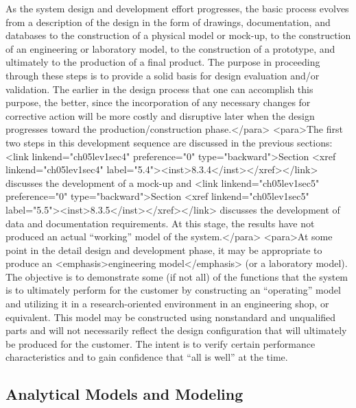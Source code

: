 As the system design and development effort progresses, the basic process evolves from a description of the design in the form of drawings, documentation, and databases to the construction of a physical model or mock-up, to the construction of an engineering or laboratory model, to the construction of a prototype, and ultimately to the production of a final product. The purpose in proceeding through these steps is to provide a solid basis for design evaluation and/or validation. The earlier in the design process that one can accomplish this purpose, the better, since the incorporation of any necessary changes for corrective action will be more costly and disruptive later when the design progresses toward the production/construction phase.</para>
<para>The first two steps in this development sequence are discussed in the previous sections: <link linkend="ch05lev1sec4" preference="0" type="backward">Section <xref linkend="ch05lev1sec4" label="5.4"><inst>8.3.4</inst></xref></link> discusses the development of a mock-up and <link linkend="ch05lev1sec5" preference="0" type="backward">Section <xref linkend="ch05lev1sec5" label="5.5"><inst>8.3.5</inst></xref></link> discusses the development of data and documentation requirements. At this stage, the results have not produced an actual “working” model of the system.</para>
<para>At some point in the detail design and development phase, it may be appropriate to produce an <emphasis>engineering model</emphasis> (or a laboratory model). The objective is to demonstrate some (if not all) of the functions that the system is to ultimately perform for the customer by constructing an “operating” model and utilizing it in a research-oriented environment in an engineering shop, or equivalent. This model may be constructed using nonstandard and unqualified parts and will not necessarily reflect the design configuration that will ultimately be produced for the customer. The intent is to verify certain performance characteristics and to gain confidence that “all is well” at the time.

\subsection{Analytical Models and Modeling}


